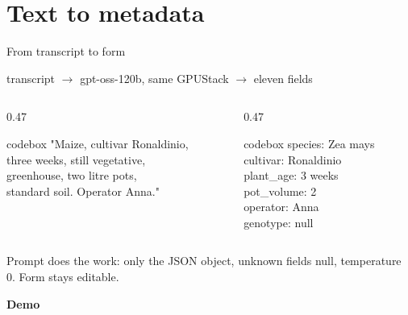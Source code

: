\documentclass[aspectratio=169,11pt]{beamer}
\newenvironment{codebox}
  {\begin{beamercolorbox}[wd=\dimexpr\textwidth-16pt\relax,sep=7pt]{codebox}\ttfamily\footnotesize}
  {\end{beamercolorbox}}
\newcommand{\key}[1]{{\color{ubBlue}\ttfamily #1}}
\newcommand{\hi}[1]{{\color{ubRed}\bfseries #1}}
\begin{document}
\section{Text to metadata}

\begin{frame}{From transcript to form}
  \vspace{0.1em}\par
  {\small\color{ubMuted}transcript $\rightarrow$ \key{gpt-oss-120b}, same GPUStack
   $\rightarrow$ eleven fields}
  \vspace{0.7em}
  \begin{columns}[t]
    \begin{column}{0.47\textwidth}
      \vspace{0pt}
      \begin{codebox}
        "Maize, cultivar Ronaldinio,\\
        three weeks, still vegetative,\\
        greenhouse, two litre pots,\\
        standard soil. Operator Anna."
      \end{codebox}
    \end{column}
    \begin{column}{0.47\textwidth}
      \vspace{0pt}
      \begin{codebox}
        species: \color{ubBlue}Zea mays\color{ubText}\\
        cultivar: \color{ubBlue}Ronaldinio\color{ubText}\\
        plant\_age: \color{ubBlue}3 weeks\color{ubText}\\
        pot\_volume: \color{ubBlue}2\color{ubText}\\
        operator: \color{ubBlue}Anna\color{ubText}\\
        genotype: \color{ubMuted}null
      \end{codebox}
    \end{column}
  \end{columns}
  \vspace{0.7em}
  {\small\color{ubMuted}Prompt does the work: only the JSON object, unknown
  fields null, \key{temperature 0}. Form stays editable.}
  \vspace{0.4em}\par
  \hi{Demo}
\end{frame}
\end{document}
